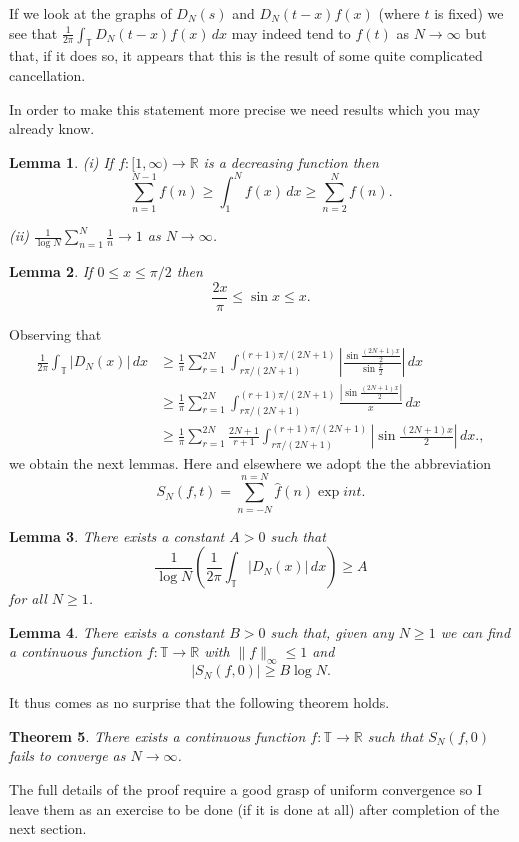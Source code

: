 \documentclass[12pt]{article}
\newtheorem{theorem}{Theorem}[section]
\newtheorem{lemma}[theorem]{Lemma}
\theoremstyle{definition}
\begin{document}
If we look at the graphs of $D_{N}(s)$ and $D_{N}(t-x)f(x)$
(where $t$ is fixed) we see that
$\frac{1}{2\pi}\int_{\mathbb T}D_{N}(t-x)f(x)\,dx$
may indeed tend to $f(t)$ as $N\rightarrow\infty$ but that,
if it does so, it appears that this is the result of some quite
complicated cancellation.

In order to make this statement more precise we need
results which you may already know.
\begin{lemma} (i) If
$f:[1,\infty)\rightarrow{\mathbb R}$ is a decreasing
function then
\[\sum_{n=1}^{N-1}f(n)\geq\int_{1}^{N}f(x)\,dx
\geq \sum_{n=2}^{N}f(n).\]

(ii) ${\displaystyle \frac{1}{\log N}\sum_{n=1}^{N}\frac{1}{n}
\rightarrow 1}$ as $N\rightarrow\infty$.
\end{lemma}
\begin{lemma} If $0\leq x\leq \pi/2$ then
\[\frac{2x}{\pi}\leq \sin x\leq x.\]
\end{lemma}

Observing that
\begin{align*}
\frac{1}{2\pi}\int_{\mathbb T}|D_{N}(x)|\,dx&
\geq \frac{1}{\pi}\sum_{r=1}^{2N}\int_{r\pi/(2N+1)}^{(r+1)\pi/(2N+1)}
\left|\frac{\sin\frac{(2N+1)x}{2}}{\sin\frac{x}{2}}\right|\,dx\\
&\geq \frac{1}{\pi}\sum_{r=1}^{2N}\int_{r\pi/(2N+1)}^{(r+1)\pi/(2N+1)}
\frac{|\sin\frac{(2N+1)x}{2}|}{x}\,dx\\
&\geq \frac{1}{\pi}\sum_{r=1}^{2N}\frac{2N+1}{r+1}
\int_{r\pi/(2N+1)}^{(r+1)\pi/(2N+1)}
\left|\sin\frac{(2N+1)x}{2}\right|\,dx.,
\end{align*}
we obtain the next lemmas.
Here and elsewhere we adopt the the abbreviation
\[S_{N}(f,t)=\sum_{n=-N}^{n=N}\hat{f}(n)\exp int.\]

\begin{lemma}\label{L Dirichlet large} 
There exists a constant $A>0$ such that
\[\frac{1}{\log N}\left(\frac{1}{2\pi}\int_{\mathbb T}|D_{N}(x)|\,dx\right)
\geq A\]
for all $N\geq 1$.
\end{lemma}
\begin{lemma}\label{L, start divergence} 
There exists a constant $B>0$ such that,
given any $N\geq 1$ we can find a continuous function
$f:{\mathbb T}\rightarrow{\mathbb R}$ with 
$\|f\|_{\infty}\leq 1$ and 
\[|S_{N}(f,0)|\geq B\log N.\]
\end{lemma}

It thus comes as no surprise that the following
theorem holds.
\begin{theorem} There exists a continuous function
$f:{\mathbb T}\rightarrow{\mathbb R}$ such that
$S_{N}(f,0)$ fails to converge as $N\rightarrow\infty$.
\end{theorem}
The full details of the proof require a good grasp of
uniform convergence so I leave them as an exercise to be
done (if it is done at all) after completion of the next section.
\end{document}
